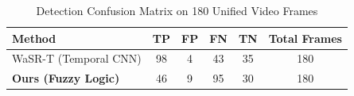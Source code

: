 \begin{table}[htbp]
\centering
\caption{Performance and Latency Benchmark on NVIDIA Jetson Orin Nano (25W Power Mode)}
\label{tab:main_benchmark_comparison}
\end{table}

\begin{table}[htbp]
\centering
\caption{Detection Confusion Matrix on 180 Unified Video Frames}
\label{tab:confusion_matrix}
\begin{tabular}{lccccc}
\toprule
Method & TP & FP & FN & TN & Total Frames \\
\midrule
WaSR-T (Temporal CNN) & 98 & 4 & 43 & 35 & 180 \\
\textbf{Ours (Fuzzy Logic)}  & 46 & 9 & 95 & 30 & 180 \\
\bottomrule
\end{tabular}
\end{table}
